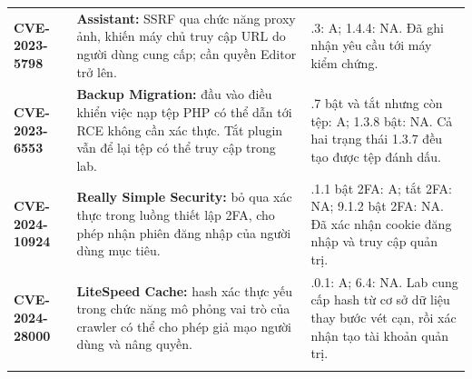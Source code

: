 \documentclass[12pt,a4paper]{article}
\begin{document}
\begin{longtable}{@{}>{\raggedright\arraybackslash}p{4.1cm}>{\raggedright\arraybackslash}p{6.9cm}>{\raggedright\arraybackslash}p{4.9cm}@{}}
\addlinespace[5pt]
\textbf{\mbox{CVE-2023-5798}} & \textbf{Assistant:} SSRF qua chức năng proxy ảnh, khiến máy chủ truy cập URL do người dùng cung cấp; cần quyền Editor trở lên. & 1.4.3: A; 1.4.4: NA. Đã ghi nhận yêu cầu tới máy kiểm chứng. \\
\addlinespace[5pt]
\textbf{\mbox{CVE-2023-6553}} & \textbf{Backup Migration:} đầu vào điều khiển việc nạp tệp PHP có thể dẫn tới RCE không cần xác thực. Tắt plugin vẫn để lại tệp có thể truy cập trong lab. & 1.3.7 bật và tắt nhưng còn tệp: A; 1.3.8 bật: NA. Cả hai trạng thái 1.3.7 đều tạo được tệp đánh dấu. \\
\addlinespace[5pt]
\textbf{\mbox{CVE-2024-10924}} & \textbf{Really Simple Security:} bỏ qua xác thực trong luồng thiết lập 2FA, cho phép nhận phiên đăng nhập của người dùng mục tiêu. & 9.1.1.1 bật 2FA: A; tắt 2FA: NA; 9.1.2 bật 2FA: NA. Đã xác nhận cookie đăng nhập và truy cập quản trị. \\
\addlinespace[5pt]
\textbf{\mbox{CVE-2024-28000}} & \textbf{LiteSpeed Cache:} hash xác thực yếu trong chức năng mô phỏng vai trò của crawler có thể cho phép giả mạo người dùng và nâng quyền. & 6.3.0.1: A; 6.4: NA. Lab cung cấp hash từ cơ sở dữ liệu thay bước vét cạn, rồi xác nhận tạo tài khoản quản trị. \\
\addlinespace[5pt]
\end{longtable}
\endgroup
{}
\end{document}
